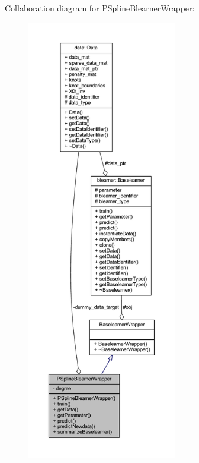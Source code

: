Collaboration diagram for P\+Spline\+Blearner\+Wrapper\+:
\nopagebreak
\begin{figure}[H]
\begin{center}
\leavevmode
\includegraphics[height=550pt]{class_p_spline_blearner_wrapper__coll__graph}
\end{center}
\end{figure}
